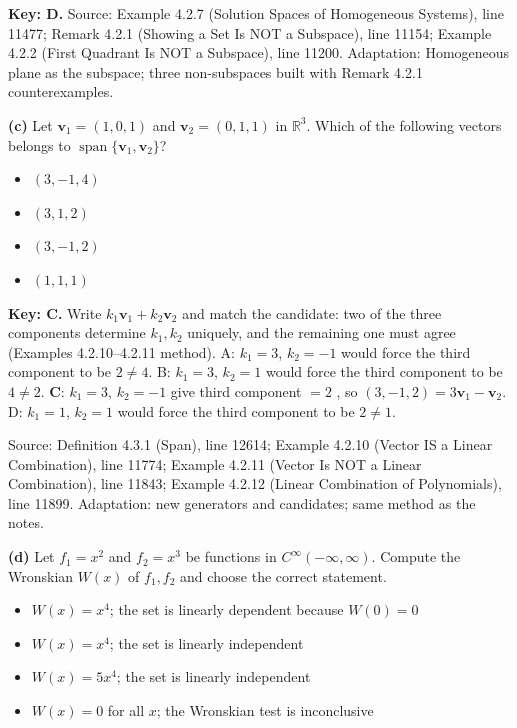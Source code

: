 \documentclass[11pt,a4paper]{article}
\newcommand{\Src}[1]{{\footnotesize\color{black!65}Source: #1}}
\begin{document}
\textbf{Key: D.} \Src{Example 4.2.7 (Solution Spaces of Homogeneous Systems), line 11477; Remark 4.2.1 (Showing a Set Is NOT a Subspace), line 11154; Example 4.2.2 (First Quadrant Is NOT a Subspace), line 11200. Adaptation: Homogeneous plane as the subspace; three non-subspaces built with Remark 4.2.1 counterexamples.}\par
\textbf{(c)} Let $\mathbf{v}_1=(1,0,1)$ and $\mathbf{v}_2=(0,1,1)$ in $\mathbb{R}^3$. Which of the following vectors belongs to $\operatorname{span}\{\mathbf{v}_1,\mathbf{v}_2\}$?\par
\begin{itemize}[leftmargin=8mm,itemsep=0pt]\item[A] $(3,-1,4)$\item[B] $(3,1,2)$\item[C$^{\ast}$] $(3,-1,2)$\item[D] $(1,1,1)$\end{itemize}
\textbf{Key: C.} Write $k_1\mathbf{v}_1+k_2\mathbf{v}_2$ and match the candidate: two of the three components determine $k_1,k_2$ uniquely, and the remaining one must agree (Examples 4.2.10--4.2.11 method). A: $k_1=3$, $k_2=-1$ would force the third component to be $2\neq4$. B: $k_1=3$, $k_2=1$ would force the third component to be $4\neq2$. \textbf{C}: $k_1=3$, $k_2=-1$ give third component $=2$ \checkmark, so $(3,-1,2)=3\mathbf{v}_1-\mathbf{v}_2$. D: $k_1=1$, $k_2=1$ would force the third component to be $2\neq1$.\par
\Src{Definition 4.3.1 (Span), line 12614; Example 4.2.10 (Vector IS a Linear Combination), line 11774; Example 4.2.11 (Vector Is NOT a Linear Combination), line 11843; Example 4.2.12 (Linear Combination of Polynomials), line 11899. Adaptation: new generators and candidates; same method as the notes.}\par
\textbf{(d)} Let $f_1=x^{2}$ and $f_2=x^{3}$ be functions in $C^{\infty}(-\infty,\infty)$. Compute the Wronskian $W(x)$ of $f_1,f_2$ and choose the correct statement.\par
\begin{itemize}[leftmargin=8mm,itemsep=0pt]\item[A] $W(x)=x^{4}$; the set is linearly dependent because $W(0)=0$\item[B$^{\ast}$] $W(x)=x^{4}$; the set is linearly independent\item[C] $W(x)=5x^{4}$; the set is linearly independent\item[D] $W(x)=0$ for all $x$; the Wronskian test is inconclusive\end{itemize}
\end{document}
